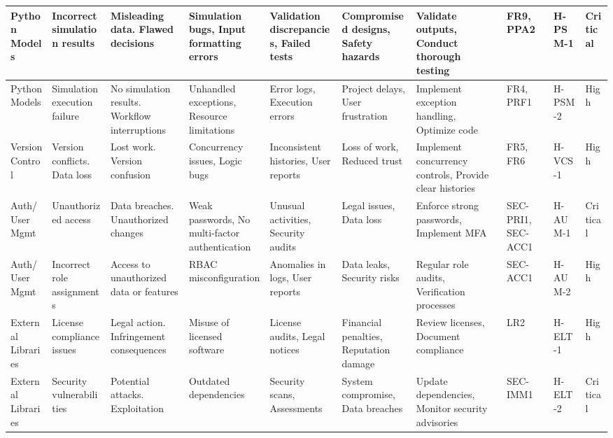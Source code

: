 \documentclass{article}
\begin{document}
\begin{landscape}
\begin{longtable}{@{} p{2cm} p{2cm} p{3cm} p{3cm} p{2.5cm} p{2.5cm} p{3.5cm} p{1cm} p{1cm} p{1cm}}
        \midrule
        
        Python Models & Incorrect simulation results & Misleading data. Flawed decisions & Simulation bugs, Input formatting errors & Validation discrepancies, Failed tests & Compromised designs, Safety hazards & Validate outputs, Conduct thorough testing & FR9, PPA2 & H-PSM-1 & Critical \\
        
        \midrule
        
        Python Models & Simulation execution failure & No simulation results. Workflow interruptions & Unhandled exceptions, Resource limitations & Error logs, Execution errors & Project delays, User frustration & Implement exception handling, Optimize code & FR4, PRF1 & H-PSM-2 & High \\
        
        \midrule
        
        Version Control & Version conflicts. Data loss & Lost work. Version confusion & Concurrency issues, Logic bugs & Inconsistent histories, User reports & Loss of work, Reduced trust & Implement concurrency controls, Provide clear histories & FR5, FR6 & H-VCS-1 & High \\
        
        \midrule
        
        Auth/User Mgmt & Unauthorized access & Data breaches. Unauthorized changes & Weak passwords, No multi-factor authentication & Unusual activities, Security audits & Legal issues, Data loss & Enforce strong passwords, Implement MFA & SEC-PRI1, SEC-ACC1 & H-AUM-1 & Critical \\
        
        \midrule
        
        Auth/User Mgmt & Incorrect role assignments & Access to unauthorized data or features & RBAC misconfiguration & Anomalies in logs, User reports & Data leaks, Security risks & Regular role audits, Verification processes & SEC-ACC1 & H-AUM-2 & High \\
        
        \midrule
        
        External Libraries & License compliance issues & Legal action. Infringement consequences & Misuse of licensed software & License audits, Legal notices & Financial penalties, Reputation damage & Review licenses, Document compliance & LR2 & H-ELT-1 & High \\
        
        \midrule
        
        External Libraries & Security vulnerabilities & Potential attacks. Exploitation & Outdated dependencies & Security scans, Assessments & System compromise, Data breaches & Update dependencies, Monitor security advisories & SEC-IMM1 & H-ELT-2 & Critical \\
    \end{longtable}
    \end{landscape}
    
\end{document}
